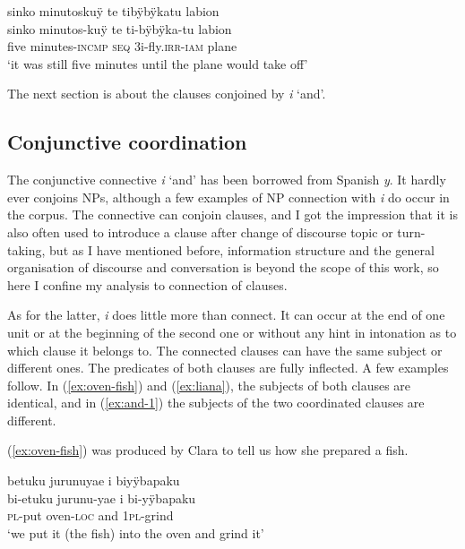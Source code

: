 \ea
\begingl
\glpreamble sinko minutoskuÿ te tibÿbÿkatu labion\\
\gla sinko minutos-kuÿ te ti-bÿbÿka-tu labion\\
\glb five minutes-\textsc{incmp} \textsc{seq} 3i-fly.\textsc{irr}-\textsc{iam} plane\\
\glft ‘it was still five minutes until the plane would take off’
\endgl
\trailingcitation{[jxx-p110923l-1.330]}
\xe
{}

The next section is about the clauses conjoined by \textit{i} ‘and’.
 
\subsection{Conjunctive coordination}\label{sec:ConjunctiveCoordination}

The conjunctive connective \textit{i} ‘and’ has been borrowed from Spanish \textit{y}. It hardly ever conjoins NPs, although a few examples of NP connection with \textit{i} do occur in the corpus. The connective can conjoin clauses, and I got the impression that it is also often used to introduce a clause after change of discourse topic or turn-taking, but as I have mentioned before, information structure and the general organisation of discourse and conversation is beyond the scope of this work, so here I confine my analysis to connection of clauses.

As for the latter, \textit{i} does little more than connect. It can occur at the end of one  unit or at the beginning of the second one or without any hint in intonation as to which clause it belongs to. The connected clauses can have the same subject or different ones. The predicates of both clauses are fully inflected. A few examples follow. In (\ref{ex:oven-fish}) and (\ref{ex:liana}), the subjects of both clauses are identical, and in (\ref{ex:and-1}) the subjects of the two coordinated clauses are different.

(\ref{ex:oven-fish}) was produced by Clara to tell us how she prepared a fish.

\ea\label{ex:oven-fish}
\begingl
\glpreamble betuku jurunuyae i biyÿbapaku\\
\gla bi-etuku jurunu-yae i bi-yÿbapaku\\
\textsc{pl}-put oven-\textsc{loc} and 1\textsc{pl}-grind\\
\glft ‘we put it (the fish) into the oven and grind it’
\endgl
\trailingcitation{[cux-c120414ls-2.158]}
\xe


